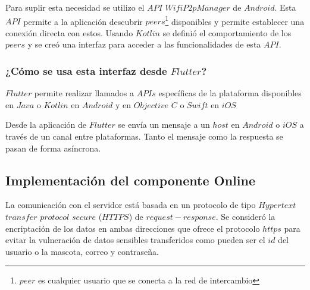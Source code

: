 Para suplir esta necesidad se utilizo el $API$ $WifiP2pManager$ de $Android$. Esta $API$ permite a la aplicación descubrir $peers$\footnote{$peer$ es cualquier usuario que se conecta a la red de intercambio} disponibles y permite establecer una conexión directa con estos. Usando $Kotlin$ se definió el comportamiento de los $peers$ y se creó una interfaz para acceder a las funcionalidades de esta $API$.

\subsubsection{¿Cómo se usa esta interfaz desde $Flutter$?}


$Flutter$ permite realizar llamados a $APIs$ específicas de la plataforma disponibles en $Java$ o $Kotlin$ en $Android$ y en $Objective$ $C$ o $Swift$ en $iOS$

Desde la aplicación de $Flutter$ se envía un mensaje a un $host$ en $Android$ o $iOS$ a través de un canal entre plataformas. Tanto el mensaje como la respuesta se pasan de forma asíncrona.

\subsection{Implementación del componente Online}
La comunicación con el servidor está basada en un protocolo de tipo $Hypertext$ $transfer$ $protocol$ $secure$ ($HTTPS$) de $request-response$. Se consideró la encriptación de los datos en ambas direcciones que ofrece el protocolo $https$ para evitar la vulneración de datos sensibles transferidos como pueden ser el $id$ del usuario o la mascota, correo y contraseña.

